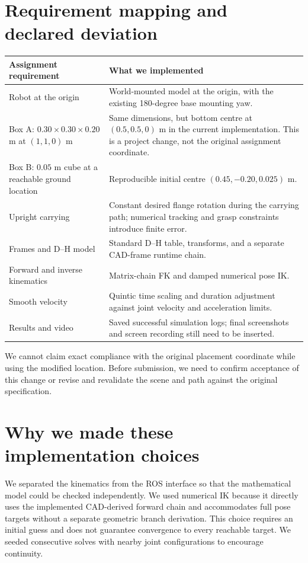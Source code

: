 \documentclass[11pt,a4paper]{report}
\begin{document}
\section{Requirement mapping and declared deviation}
\begin{longtable}{p{.29\linewidth}p{.62\linewidth}}
\toprule Assignment requirement & What we implemented \\\midrule
Robot at the origin & World-mounted model at the origin, with the existing 180-degree base mounting yaw.\\
Box A: $0.30\times0.30\times0.20$ m at $(1,1,0)$ m & Same dimensions, but bottom centre at $(0.5,0.5,0)$ m in the current implementation. This is a project change, not the original assignment coordinate.\\
Box B: $0.05$ m cube at a reachable ground location & Reproducible initial centre $(0.45,-0.20,0.025)$ m.\\
Upright carrying & Constant desired flange rotation during the carrying path; numerical tracking and grasp constraints introduce finite error.\\
Frames and D--H model & Standard D--H table, transforms, and a separate CAD-frame runtime chain.\\
Forward and inverse kinematics & Matrix-chain FK and damped numerical pose IK.\\
Smooth velocity & Quintic time scaling and duration adjustment against joint velocity and acceleration limits.\\
Results and video & Saved successful simulation logs; final screenshots and screen recording still need to be inserted.\\\bottomrule
\end{longtable}
We cannot claim exact compliance with the original placement coordinate while using the modified location. Before submission, we need to confirm acceptance of this change or revise and revalidate the scene and path against the original specification.
\section{Why we made these implementation choices}
We separated the kinematics from the ROS interface so that the mathematical model could be checked independently. We used numerical IK because it directly uses the implemented CAD-derived forward chain and accommodates full pose targets without a separate geometric branch derivation. This choice requires an initial guess and does not guarantee convergence to every reachable target. We seeded consecutive solves with nearby joint configurations to encourage continuity.
\end{document}
